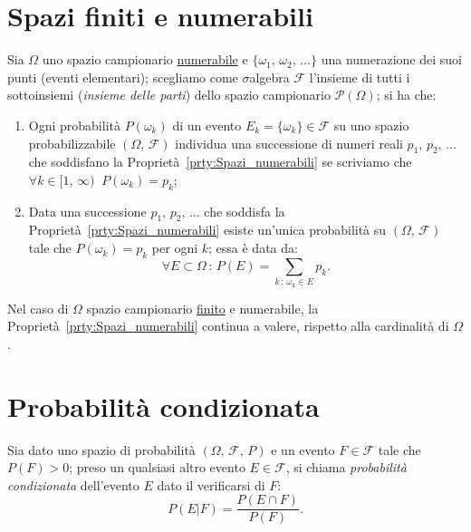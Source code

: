     \section{Spazi finiti e numerabili}
    \begin{prty}\label{prty:Spazi_numerabili}
        Sia $\Omega$ uno spazio campionario \underline{numerabile} e  $\{\omega_1,\,\omega_2,\,\ldots\}$ una numera\-zione dei suoi punti (eventi elementari); scegliamo come $\sigma$\nbdash algebra  $\mathscr{F}$ l'insieme di tutti i sottoinsiemi (\emph{insieme delle parti}) dello spazio campionario  $\mathscr{P}(\Omega)$; si ha che:
            \begin{enumerate}
                \item Ogni probabilità $P({\omega_k})$ di un evento $E_k = \{\omega_k\} \in \mathscr{F}$ su uno spazio probabiliz\-zabile $(\Omega,\,\mathscr{F})$ individua una successione di numeri reali $p_1,\,p_2,\,\ldots$ che soddisfano la Proprietà~\ref{prty:Spazi_numerabili} se scriviamo che $\forall k \in [1,\,\infty)\,\:\,P({\omega_k}) = p_k$;
                \item Data una successione $p_1,\,p_2,\,\ldots$ che soddisfa la Proprietà~\ref{prty:Spazi_numerabili} esiste un'unica probabilità su $(\Omega,\,\mathscr{F})$ tale che  $P({\omega_k}) = p_k$ per ogni  $k$; essa è data da: \[
                        \forall E \subset \Omega\,:\,P(E) = \sum_{k\,:\,\omega_k \in E} p_k
                .\] 
            \end{enumerate}
        \end{prty}
        \begin{obsv}
            Nel caso di $\Omega$ spazio campionario \underline{finito} e numerabile, la Proprietà~\ref{prty:Spazi_numerabili} continua a valere, rispetto alla cardinalità di $\Omega$.
        \end{obsv}
    \section{Probabilità condizionata}
    \begin{defn}\label{defn:Probabilità_condizionata}
            Sia dato uno spazio di probabilità $(\Omega,\,\mathscr{F},\,P)$ e un evento $F \in \mathscr{F}$ tale che $P(F) > 0$; preso un qualsiasi altro evento $E \in \mathscr{F}$, si chiama \emph{probabilità condizionata} dell'evento $E$ dato il verificarsi di $F$:
            \begin{equation}\label{eq:Formula_probabilità_condizionata}
                P(E|F) = \frac{P(E \cap F)}{P(F)}
            .
            \end{equation}
        \end{defn}
